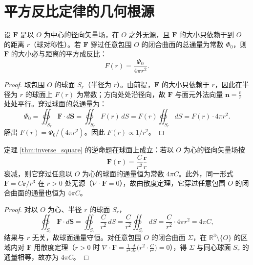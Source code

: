 \section{\texorpdfstring{平方反比定律的几何根源}{平方反比定律的几何根源}}

\begin{theorem}[平方反比定律的几何推导]\label{thm:inverse_square}
设 $\mathbf{F}$ 是以 $O$ 为中心的径向矢量场，在 $O$ 之外无源，且 $\mathbf{F}$ 的大小只依赖于到 $O$ 的距离 $r$（球对称性）。若 $\mathbf{F}$ 穿过任意包围 $O$ 的闭合曲面的总通量为常数 $\Phi_0$，则 $\mathbf{F}$ 的大小必与距离的平方成反比：
\[F(r) = \frac{\Phi_0}{4\pi r^2}.\]
\end{theorem}

\begin{proof}
取包围 $O$ 的球面 $S_r$（半径为 $r$）。由前提，$\mathbf{F}$ 的大小只依赖于 $r$，因此在半径为 $r$ 的球面上 $F(r)$ 为常数；方向处处沿径向，故 $\mathbf{F}$ 与面元外法向量 $\mathbf{n} = \frac{\mathbf{r}}{r}$ 处处平行。穿过球面的总通量为：
\[\Phi_0 = \oiint_{S_r} \mathbf{F} \cdot d\mathbf{S} = \oiint_{S_r} F(r) \, dS = F(r) \oiint_{S_r} dS = F(r) \cdot 4\pi r^2.\]
解出 $F(r) = \Phi_0/(4\pi r^2)$。因此 $F(r) \propto 1/r^2$。
\end{proof}

\begin{corollary}\label{cor:inverse_square_converse}
定理 \ref{thm:inverse_square} 的逆命题在球面上成立：若以 $O$ 为心的径向矢量场按
\[\mathbf{F}(\mathbf{r}) = \frac{C}{r^2} \frac{\mathbf{r}}{r}\]
衰减，则它穿过任意以 $O$ 为心的球面的通量恒为常数 $4\pi C$。此外，同一形式 $\mathbf F=C\mathbf r/r^3$ 在 $r>0$ 处无源（$\nabla\cdot\mathbf F=0$），故由散度定理，它穿过任意包围 $O$ 的闭合曲面的通量也恒为 $4\pi C$。
\end{corollary}

\begin{proof}
对以 $O$ 为心、半径 $r$ 的球面 $S_r$，
\[\oiint_{S_r} \mathbf{F} \cdot d\mathbf{S} = \oiint_{S_r} \frac{C}{r^2} \, dS = \frac{C}{r^2} \oiint_{S_r} dS = \frac{C}{r^2} \cdot 4\pi r^2 = 4\pi C,\]
结果与 $r$ 无关，故球面通量守恒。对任意包围 $O$ 的闭合曲面 $\Sigma$，在 $\mathbb{R}^3\setminus\{O\}$ 的区域内对 $\mathbf F$ 用散度定理（$r>0$ 时 $\nabla\cdot\mathbf F=\frac{1}{r^2}\frac{d}{dr}\bigl(r^2\cdot\frac{C}{r^2}\bigr)=0$），得 $\Sigma$ 与同心球面 $S_r$ 的通量相等，故亦为 $4\pi C$。
\end{proof}

